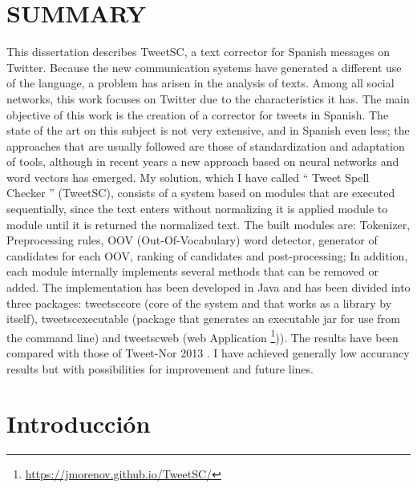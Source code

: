 \documentclass[spanish,12pt, a4paper,twoside]{paper}
\let\oldsection\section
\def\section{\cleardoublepage\oldsection}
\begin{document}
\section*{SUMMARY}
This dissertation describes TweetSC, a text corrector for Spanish messages on Twitter. Because the new communication systems have generated a different use of the language, a problem has arisen in the analysis of texts. Among all social networks, this work focuses on Twitter due to the characteristics it has. The main objective of this work is the creation of a corrector for tweets in Spanish. The state of the art on this subject is not very extensive, and in Spanish even less; the approaches that are usually followed are those of standardization and adaptation of tools, although in recent years a new approach based on neural networks and word vectors has emerged. My solution, which I have called `` Tweet Spell Checker '' (TweetSC), consists of a system based on modules that are executed sequentially, since the text enters without normalizing it is applied module to module until it is returned the normalized text. The built modules are: Tokenizer, Preprocessing rules, OOV (Out-Of-Vocabulary) word detector, generator of candidates for each OOV, ranking of candidates and post-processing; In addition, each module internally implements several methods that can be removed or added. The implementation has been developed in Java and has been divided into three packages: tweetsccore (core of the system and that works as a library by itself), tweetscexecutable (package that generates an executable jar for use from the command line) and tweetscweb (web Application \footnote{\url{https://jmorenov.github.io/TweetSC/}})). The results have been compared with those of Tweet-Nor 2013 \cite{alegria:2013}. I have achieved generally low accurancy results but with possibilities for improvement and future lines.


\tableofcontents %



\listoffigures
\listoftables



\newpage
{} 

\section{Introducción}\label{sec:introduccion}
\end{document}
